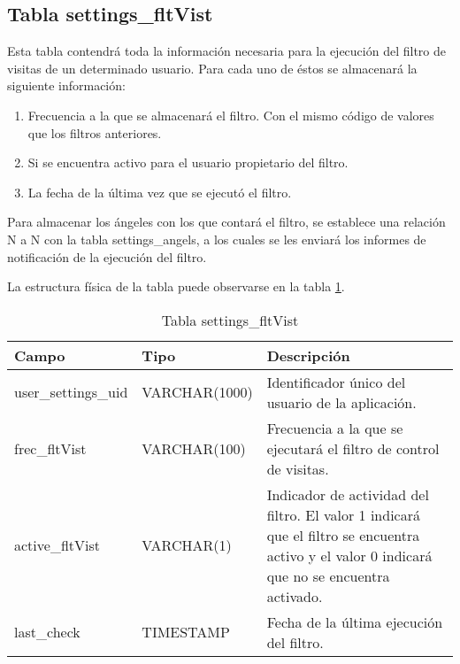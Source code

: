 \subsection{Tabla settings\_fltVist}
Esta tabla contendrá toda la información necesaria para la ejecución del filtro de visitas de un determinado usuario. Para cada uno de éstos se almacenará la siguiente información:
\begin{enumerate}
\item Frecuencia a la que se almacenará el filtro. Con el mismo código de valores que los filtros anteriores.
\item Si se encuentra activo para el usuario propietario del filtro.
\item La fecha de la última vez que se ejecutó el filtro.
\end{enumerate}
Para almacenar los ángeles con los que contará el filtro, se establece una relación N a N con la tabla settings\_angels, a los cuales se les enviará los informes de notificación de la ejecución del filtro.
\bigskip
\par
La estructura física de la tabla puede observarse en la tabla \ref{tabSettingsFltVist}.
\begin{table}
\begin{center}
\begin{tabular}[c]{| l | l | p{60mm} |}\hline
\textbf{Campo}&\textbf{Tipo}&\textbf{Descripción} \\ \hline
user\_settings\_uid & VARCHAR(1000) & Identificador único del usuario de la aplicación. \\ \hline
frec\_fltVist & VARCHAR(100) & Frecuencia a la que se ejecutará el filtro de control de visitas. \\ \hline
active\_fltVist & VARCHAR(1) & Indicador de actividad del filtro. El valor 1 indicará que el filtro se encuentra activo y el valor 0 indicará que no se encuentra activado. \\ \hline
last\_check & TIMESTAMP & Fecha de la última ejecución del filtro. \\ \hline
\end{tabular}
\end{center}
\caption{Tabla settings\_fltVist} \label{tabSettingsFltVist}
\end{table}

